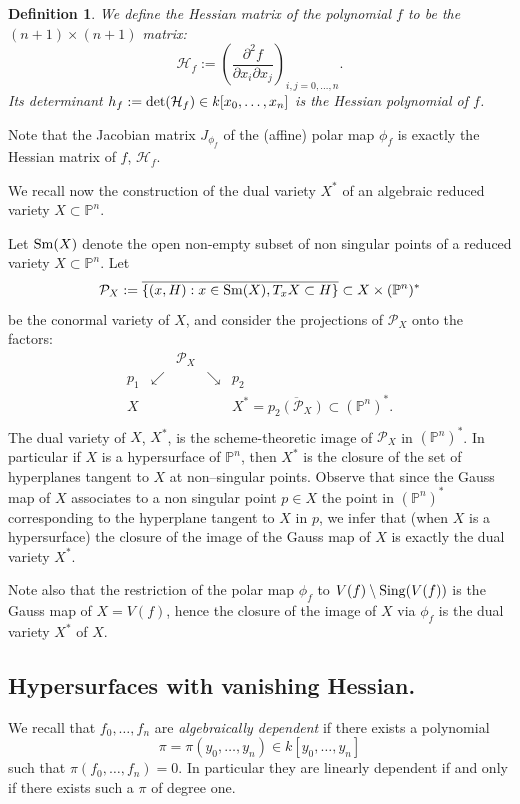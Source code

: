 \documentclass[11pt,a4paper]{amsart}
\newtheorem{defi}[theorem]{Definition}
\newcommand{\ch}{\mathcal{H}}
\begin{document}
\begin{defi}{\em We define   the {\it Hessian matrix} of the polynomial
$f$ to be  the $(n+1)\times(n+1)$ matrix:
$$\ch_f :=\left( \frac{\partial^2 f}{\partial x_i\partial x_j}\right) _{i,j=0,\ldots ,n}.$$
Its determinant $h_f:={\rm det}(\ch_f)\in
k[x_0, \ldots, x_n]$ is  the {\it Hessian polynomial} of
$f$.}\end{defi}

Note that the Jacobian matrix $J_{\phi_f}$
of  the (affine) polar map $\phi_f$ is exactly the Hessian matrix of $f$,
$\ch_f$.


We recall now the construction of the dual variety $X^*$ of an
algebraic reduced  variety $X\subset \mathbb{P}^n$.

Let ${\rm Sm}(X)$ denote the open non-empty subset of non singular points of a reduced variety $X\subset \mathbb{P}^n$.
Let
$$\mathcal{P}_X:=\overline{\{(x,H) : x\in {\rm Sm}(X), T_xX\subset H\}}\subset X\times(\mathbb{P}^n)^*$$ be the conormal variety of $X$, and consider the projections of $\mathcal{P}_X$ onto the factors:
$$
\begin{array}{ccccl}
&&\mathcal{P}_X&&\\
p_1&\swarrow&&\searrow&p_2\\
X&&&&X^*=\overline{p_2(\mathcal{P}_X)}\subset(\mathbb{P}^n)^*.\\
\end{array}
$$
The dual variety of $X$, $X^*$, is the scheme-theoretic image of
$\mathcal{P}_X$ in $(\mathbb{P}^n)^*$. In particular if $X$ is a
hypersurface of $\mathbb{P}^n$, then $X^*$ is the closure of the
set of hyperplanes tangent to $X$ at non--singular points. Observe
that  since  the Gauss map of $X$ associates to a non singular
point  $p\in X$ the point in $(\mathbb{P}^n)^{*}$ corresponding to
the hyperplane tangent to $X$ in $p$, we infer that (when $X$ is a
hypersurface) the closure of the image of the Gauss map of $X$ is
exactly the dual variety $X^*$.

Note also that the restriction of the polar map $\phi_f$ to
$V(f)\setminus{\rm Sing} (V(f))$  is the Gauss map of $X=V(f)$,
hence the closure of the  image of $X$ via $\phi_f$ is the dual
variety $X^*$ of $X$.


\subsection{Hypersurfaces with vanishing Hessian.}

We recall that $f_0, \ldots, f_n$ are \textit{algebraically
dependent} if there exists a polynomial $$\pi=\pi (y_0, \ldots,
y_n)\in k[y_0, \ldots, y_n]$$ such that $\pi(f_0,\ldots, f_n)=0$.
In particular they are linearly dependent if and only if there
exists such a $\pi$ of degree one.
\end{document}
